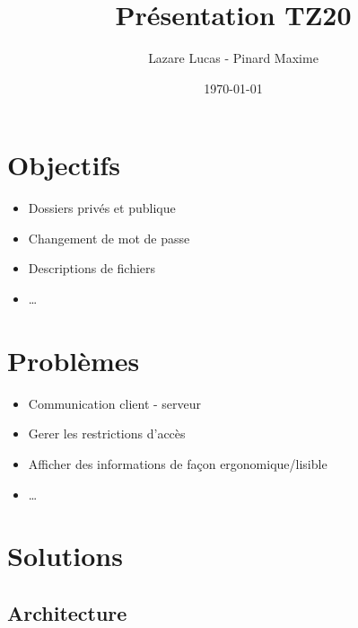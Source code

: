 \documentclass[11pt]{beamer}
\author{Lazare Lucas - Pinard Maxime}
\title{Présentation TZ20}
\institute{UTBM}
\date{\today}
\begin{document}
\begin{frame}
	\titlepage{}
\end{frame}

\begin{frame}
	\tableofcontents{}
\end{frame}

\section{Objectifs}

	\begin{frame}
		\begin{itemize}
			\item{} Dossiers privés et publique
			\item{} Changement de mot de passe
			\item{} Descriptions de fichiers
			\item{} \ldots{}
		\end{itemize}
	\end{frame}

\section{Problèmes}

	\begin{frame}
		\begin{itemize}
			\item{} Communication client - serveur
			\item{} Gerer les restrictions d'accès
			\item{} Afficher des informations de façon ergonomique/lisible
			\item{} \ldots{}
		\end{itemize}
	\end{frame}

\section{Solutions}
	
	\subsection*{Architecture}
\end{document}

